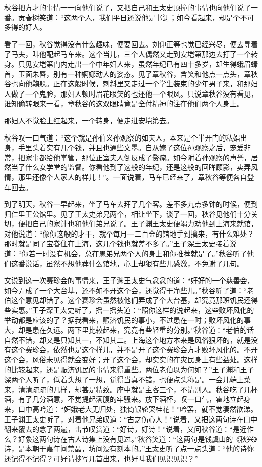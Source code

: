 \documentclass[12pt,UTF8]{ctexbook}
\begin{document}
{{{秋谷把方才的事情一一向他们说了，又把自己和王太史顶撞的事情也向他们说了一番。贡春树笑道：“这两个人，我们平日还说他是书迂；如今看起来，却是个不可多得的好人。

看了一回，秋谷觉得没有什么趣味，便要回去。刘仰正等也觉已经兴尽，便去寻着了马夫，叫他配起马车来。这个当儿，三个人偶然又走到安垲第那边去打了一个转身。只见安垲第门内走出一个中年妇人来，虽然年纪已有四十多岁，却生得蛾眉螓首，玉面朱唇，别有一种婀娜动人的姿态。见了章秋谷，含笑和他点一点头，章秋谷也向他鞠躲。正在这般时候，刺斜里又走过一个学生装束的少年男子来，和那妇人做了一个鬼脸，那妇人顿时眉花眼笑的也还他一个眼风。只说章秋谷没有看见，谁知偷转眼来一看，章秋谷的这双眼睛竟是全付精神的注在他们两个人身上。

那妇人不觉脸上红起来，一个转身，便走进安垲第去。

秋谷叹一口气道：“这个就是孙伯义孙观察的如夫人。本来是个半开门的私娼出身，手里头着实有几个钱，并且也通些文墨。自从嫁了这位孙观察之后，宠爱非常，把家事都给他掌管，那位正室夫人倒反成了赘瘤。如今附着孙观察的声誉，居然当了什么女学堂的监督。你看他到了这般的年纪，还是这般的回眸顾影，卖弄风情，那里还像个人家人的样儿！”。一面说着，马车已经来了，章秋谷等便各自登车回去。

到了明天，秋谷一早起来，坐了马车去拜了几个客。差不多九点多钟的时候，便到归仁里王公馆里。见了王太史弟兄两个，相让坐下，谈了一回，秋谷见他们十分关切，便把自己的家计也和他们弟兄说了。王子渊王太史便竭力劝他到上海来就馆，对他说道：“像你这般的才干，就个每月一二百金的馆地手到擒来，有什么难处？那时就是同了宝眷住在上海，这几个钱也就差不多了。”王子深王太史接着说道：“你若一时没有机会，总在愚弟兄两个人的身上和你推荐就是了。”秋谷听了他们这番说话，虽然不想他荐什么馆地，心上却狠有些儿感激，不免谢了几句。

文说到这一次赛珍会的事情来，王子渊王太史气忿忿的道：“好好的一个慈善会，如今弄成了一个大台基，还不如不开这个会，还觉得干净些儿。”秋谷听了道：“老伯这个意见却错了。这个赛珍会虽然被他们弄成了个大台基，却究竟那班饥民还得些实惠。”王子深王太史听了，摇一摇头道：“照你这样的说起来，这些败坏风化的举动都是应该的了？据我看来，赈济饥民的事小，不过患在一时；败坏风化的事大，却是患在久远。两下里比较起来，究竟有些轻重的分别。”秋谷道：“老伯的话自然不错，却又是只知其一，不知其二。上海这个地方本来是风俗狠坏的，就是没有这个赛珍会，依然也是这个样儿，并不是开了这个赛珍会方才败坏风化的。不开这个会，风俗未见得就会变好；开了这个会，却实实的在灾民身上有些益处。这样的比较起来，还是赈济饥民的事情来得重些。两位老伯以为何如？”王子渊和王子深两个人听了，低着头想了一想，觉得当真不错，也便点头称是。一会儿端上菜来，清清疏疏的几样，却甚是精致。座中就是主客三个，不请别人。秋谷吃了几杯酒，有了几分酒意，不觉提起满腹的牢骚来。放下酒杯，叹一口气，霍地立起身来，口中高吟道：“姮娥老大无归处，独倚银轮哭桂花！”吟罢，就不觉凄然欲涕。王子渊王太史听了，对着他兄弟叹道：“古之伤心人！”说着，又把这两句诗在口中翻来覆去的念了两遍，击节叹赏道：“好诗，好诗！”说着，又问秋谷道：“是近作么？好象这两句诗在古人诗集上没有见过。”秋谷笑道：“这两句是钱虞山的《秋兴》诗，是本朝干嘉年间禁晶，坊间没有刻本的。”王太史听了点一点头道：“他的诗你还记得不记得？可好请抄写几首出来，也好叫我们见识见识？”

}}}
\end{document}
